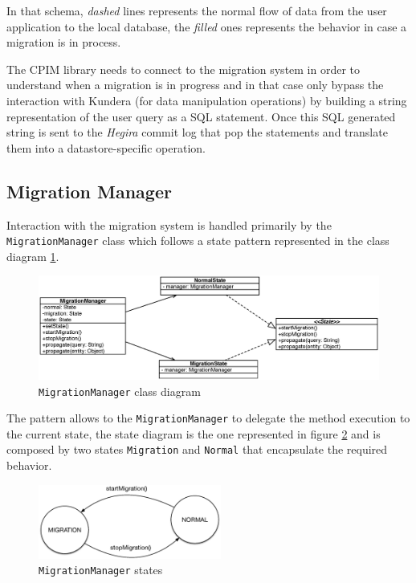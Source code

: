 \noindent In that schema, \textit{dashed} lines represents the normal flow of data from the user application to the local database, the \textit{filled} ones represents the behavior in case a migration is in process.

\noindent The CPIM library needs to connect to the migration system in order to understand when a migration is in progress and in that case only bypass the interaction with Kundera (for data manipulation operations) by building a string representation of the user query as a SQL statement. Once this SQL generated string is sent to the \textit{Hegira} commit log that pop the statements and translate them into a datastore-specific operation.

\subsection{Migration Manager}
Interaction with the migration system is handled primarily by the \texttt{MigrationManager} class which follows a state pattern represented in the class diagram \ref{fig:migration-class-diagram}. 
 
\begin{figure}[tbh]
  \centering
  \includegraphics[width=14cm]{images/migration_class_diagram}
  \caption{\texttt{MigrationManager} class diagram}
  \label{fig:migration-class-diagram}
\end{figure} 

\noindent The pattern allows to the \texttt{MigrationManager} to delegate the method execution to the current state, the state diagram is the one represented in figure \ref{fig:migration-fsa} and is composed by two states \texttt{Migration} and \texttt{Normal} that encapsulate the required behavior.
    
\begin{figure}[tbh]
  \centering
  \includegraphics[width=6cm]{images/migration_fsa}
  \caption{\texttt{MigrationManager} states}
  \label{fig:migration-fsa}
\end{figure} 

